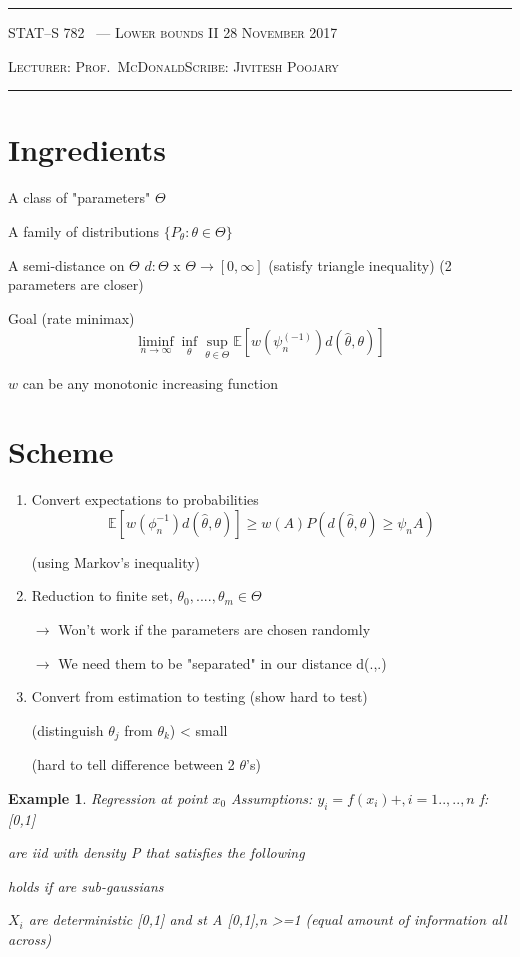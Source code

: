 \documentclass[10pt]{article}
\newcounter{lecnum}
\newtheorem{example}[ex]{Example}
\newcommand{\Expect}[1]{\mathbb{E}\!\left[#1\right]}
\renewcommand{\hat}{\widehat}
\newcommand{\lecturer}{Prof.\ McDonald}
\newcommand{\scribe}{Jivitesh Poojary}
\newcommand{\chtitle}{Lower bounds II}
\newcommand{\lecdate}{28 November 2017}
\begin{document}
\rule{6.5in}{1pt}

\textsc{STAT--S 782
        \hfill \thelecnum\ --- \chtitle
        \hfill \lecdate}

\textsc{Lecturer: \lecturer \hfill Scribe: \scribe}
\rule{6.5in}{1pt}


\section{Ingredients}

A class of "parameters" $\Theta$

A family of distributions $\{ P_\theta : \theta \in \Theta\}$

A semi-distance on $\Theta$
$d: \Theta$ x $\Theta \longrightarrow [0,\infty]$
(satisfy triangle inequality)
(2 parameters are closer)

Goal (rate minimax)
$$\liminf_{n\to\infty} \inf_{\theta} \sup_{\theta \in \Theta} \Expect{{w(\psi^{(-1)}_n)d(\hat \theta,\theta)}}$$ 

$w$ can be any monotonic increasing function

\section{Scheme}
\begin{enumerate}

\item Convert expectations to probabilities
$$\Expect{{w(\phi^{-1}_n)d(\hat \theta,\theta)}}  \geq w(A)P(d(\hat \theta,\theta) \geq \psi_n A)$$

(using Markov's inequality)

\item Reduction to finite set, $\theta_0,....,\theta_m \in \Theta$ 

$\longrightarrow$ Won't work if the parameters are chosen randomly

$\longrightarrow$ We need them to be "separated" in our distance d(.,.)

\item Convert from estimation to testing (show hard to test)

(distinguish $\theta_j$ from $\theta_k$) < small 

(hard to tell difference between 2 $\theta$'s)
\end{enumerate}

\begin{example} 
Regression at point $x_0$
Assumptions:
$y_i = f(x_i) + , i = 1..,..,n$
f:[0,1] 

are iid with density P that satisfies the following

holds if  are sub-gaussians

$X_i$ are deterministic [0,1] and  st A [0,1],n >=1
(equal amount of information all across)
\end{example}
\end{document}
